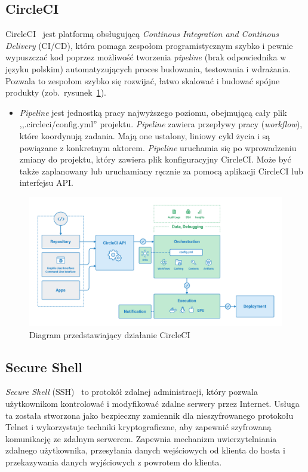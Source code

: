 	\subsection{CircleCI}
	CircleCI~\cite{circleci} jest platformą obsługującą \textit{Continous Integration and Continous Delivery} (CI/CD), która pomaga zespołom programistycznym szybko i pewnie wypuszczać kod poprzez możliwość tworzenia \textit{pipeline} (brak odpowiednika w języku polskim) automatyzujących proces budowania, testowania i wdrażania. Pozwala to zespołom szybko się rozwijać, łatwo skalować i budować spójne produkty (zob.~rysunek~\ref{rys:circleci_diagram}).
	\begin{itemize}
	\item \textit{Pipeline} jest jednostką pracy najwyższego poziomu, obejmującą cały plik ,,.circleci/config.yml'' projektu. \textit{Pipeline} zawiera przepływy pracy (\textit{workflow}), które koordynują zadania. Mają one ustalony, liniowy cykl życia i są powiązane z konkretnym aktorem. \textit{Pipeline} uruchamia się po wprowadzeniu zmiany do projektu, który zawiera plik konfiguracyjny CircleCI. Może być także zaplanowany lub uruchamiany ręcznie za pomocą aplikacji CircleCI lub interfejsu API.
	\end{itemize}
\begin{figure}[H]
\centering\includegraphics[width=\textwidth]{figures/circleci_schema}
\caption{Diagram przedstawiający działanie CircleCI~\cite{circleci_schema}}\label{rys:circleci_diagram}
\end{figure}

	\subsection{Secure Shell}
	\textit{Secure Shell} (SSH)~\cite{ssh} to protokół zdalnej administracji, który pozwala użytkownikom kontrolować i modyfikować zdalne serwery przez Internet. Usługa ta została stworzona jako bezpieczny zamiennik dla nieszyfrowanego protokołu Telnet i wykorzystuje techniki kryptograficzne, aby zapewnić szyfrowaną komunikację ze zdalnym serwerem. Zapewnia mechanizm uwierzytelniania zdalnego użytkownika, przesyłania danych wejściowych od klienta do hosta i przekazywania danych wyjściowych z powrotem do klienta.
	
